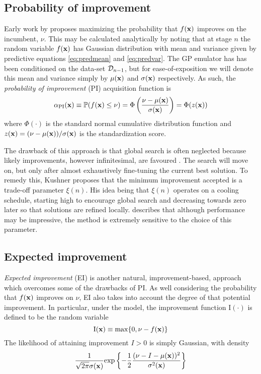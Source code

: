 \subsection{Probability of improvement} \label{sec:pi}

Early work by \citet{kushner1964new} proposes maximizing the probability that $f(\mathbf{x})$ improves on the incumbent, $\nu$. This may be calculated analytically by noting that at stage $n$ the random variable $f(\mathbf{x})$ has Gaussian distribution with mean and variance given by predictive equations \ref{eq:predmean} and \ref{eq:predvar}. The GP emulator has has been conditioned on the data-set $\mathcal{D}_{n-1}$, but for ease-of-exposition we will denote this mean and variance simply by $\mu(\mathbf{x})$ and $\sigma(\mathbf{x})$ respectively. As such, the \textit{probability of improvement} (PI) acquisition function is
%
\begin{equation}
\alpha_\mathrm{PI}(\mathbf{x}) \equiv \mathbb{P}(f(\mathbf{x}) \leq \nu)
= \Phi\left(\frac{\nu - \mu(\mathbf{x})}{\sigma(\mathbf{x})}\right)
= \Phi(z(\mathbf{x}))
\end{equation}
%
where $\Phi(\cdot)$ is the standard normal cumulative distribution function and $z(\mathbf{x}) = {(\nu - \mu(\mathbf{x}))}/{\sigma(\mathbf{x})}$ is the standardization score.

The drawback of this approach is that global search is often neglected because likely improvements, however infinitesimal, are favoured \cite{brochu2010interactive}. The search will move on, but only after almost exhaustively fine-tuning the current best solution. To remedy this, Kushner proposes that the minimum improvement accepted is a trade-off parameter $\xi(n)$. His idea being that $\xi(n)$ operates on a cooling schedule, starting high to encourage global search and decreasing towards zero later so that solutions are refined locally. \citet{jones2001taxonomy} describes that although performance may be impressive, the method is extremely sensitive to the choice of this parameter.

\subsection{Expected improvement} \label{sec:ei}

\textit{Expected improvement} (EI) \citep{mockus1974bayesian} is another natural, improvement-based, approach which overcomes some of the drawbacks of PI. As well considering the probability that $f(\mathbf{x})$ improves on $\nu$, EI also takes into account the degree of that potential improvement. In particular, under the model, the improvement function $\mathrm{I}(\cdot)$ is defined to be the random variable
%
\begin{equation}
\mathrm{I}(\mathbf{x}) \equiv \max \{0, \nu - f(\mathbf{x})\}
\end{equation}
%
The likelihood of attaining improvement $I > 0$ is simply Gaussian, with density
%
\begin{equation}
\frac{1}{\sqrt{2\pi}\sigma(\mathbf{x})} \textrm{exp} \left \{ -\frac{1}{2} \frac{(\nu - I - \mu(\mathbf{x}))^2}{\sigma^2(\mathbf{x})} \right \}
\end{equation} 

